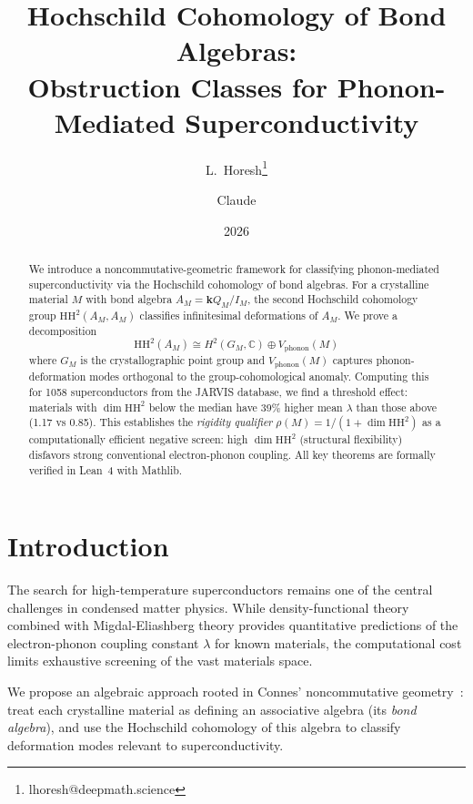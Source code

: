 \documentclass[12pt,a4paper]{article}
\title{Hochschild Cohomology of Bond Algebras:\\
  Obstruction Classes for Phonon-Mediated Superconductivity}
\author{L.\ Horesh\thanks{lhoresh@deepmath.science} \and Claude}
\date{2026}
\newcommand{\HH}{\mathrm{HH}}
\newcommand{\kk}{\mathbf{k}}
\newcommand{\CC}{\mathbb{C}}
\begin{document}
\maketitle

\begin{abstract}
We introduce a noncommutative-geometric framework for classifying
phonon-mediated superconductivity via the Hochschild cohomology of
bond algebras. For a crystalline material $M$ with bond algebra
$A_M = \kk Q_M / I_M$, the second Hochschild cohomology group
$\HH^2(A_M, A_M)$ classifies infinitesimal deformations of $A_M$.
We prove a decomposition
\[
  \HH^2(A_M) \cong H^2(G_M, \CC) \oplus V_{\mathrm{phonon}}(M)
\]
where $G_M$ is the crystallographic point group and
$V_{\mathrm{phonon}}(M)$ captures phonon-deformation modes
orthogonal to the group-cohomological anomaly. Computing this for 1058 superconductors from the JARVIS database,
we find a threshold effect: materials with $\dim\HH^2$ below the
median have 39\% higher mean $\lambda$ than those above (1.17 vs
0.85). This establishes the \emph{rigidity qualifier}
$\rho(M) = 1/(1 + \dim\HH^2)$ as a computationally efficient
negative screen: high $\dim\HH^2$ (structural flexibility)
disfavors strong conventional electron-phonon coupling. All key theorems are formally verified in Lean~4
with Mathlib.
\end{abstract}

\tableofcontents

\section{Introduction}
\label{sec:intro}

The search for high-temperature superconductors remains one of the
central challenges in condensed matter physics. While
density-functional theory combined with Migdal-Eliashberg theory
provides quantitative predictions of the electron-phonon coupling
constant $\lambda$ for known materials, the computational cost
limits exhaustive screening of the vast materials space.

We propose an algebraic approach rooted in Connes'
noncommutative geometry~\cite{connes1994}: treat each crystalline
material as defining an associative algebra (its \emph{bond algebra}),
and use the Hochschild cohomology of this algebra to classify
deformation modes relevant to superconductivity.
\end{document}
